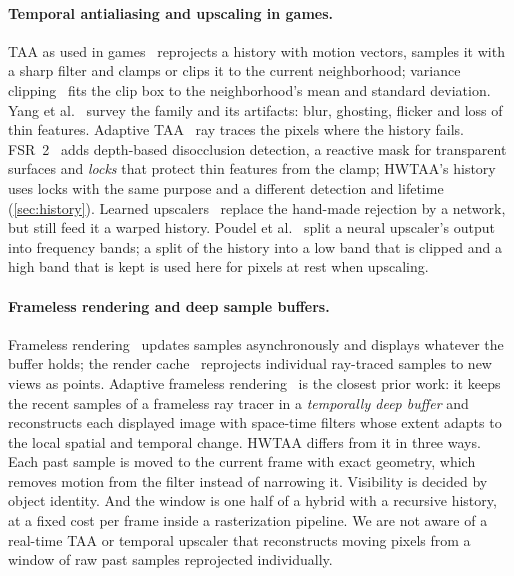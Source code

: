 \documentclass[11pt,a4paper]{article}
\begin{document}
\paragraph{Temporal antialiasing and upscaling in games.} TAA as used in games~\cite{karis2014taa,jimenez2016filmic} reprojects a history with motion vectors, samples it with a sharp filter and clamps or clips it to the current neighborhood; variance clipping~\cite{salvi2016taa} fits the clip box to the neighborhood's mean and standard deviation. Yang et al.~\cite{yang2020survey} survey the family and its artifacts: blur, ghosting, flicker and loss of thin features. Adaptive TAA~\cite{marrs2018ataa} ray traces the pixels where the history fails. FSR~2~\cite{amd2023fsr2} adds depth-based disocclusion detection, a reactive mask for transparent surfaces and \emph{locks} that protect thin features from the clamp; HWTAA's history uses locks with the same purpose and a different detection and lifetime (\cref{sec:history}). Learned upscalers~\cite{liu2020dlss,xiao2020neural} replace the hand-made rejection by a network, but still feed it a warped history. Poudel et al.~\cite{poudel2026wavelet} split a neural upscaler's output into frequency bands; a split of the history into a low band that is clipped and a high band that is kept is used here for pixels at rest when upscaling.

\paragraph{Frameless rendering and deep sample buffers.} Frameless rendering~\cite{bishop1994frameless} updates samples asynchronously and displays whatever the buffer holds; the render cache~\cite{walter1999rendercache} reprojects individual ray-traced samples to new views as points. Adaptive frameless rendering~\cite{dayal2005frameless} is the closest prior work: it keeps the recent samples of a frameless ray tracer in a \emph{temporally deep buffer} and reconstructs each displayed image with space-time filters whose extent adapts to the local spatial and temporal change. HWTAA differs from it in three ways. Each past sample is moved to the current frame with exact geometry, which removes motion from the filter instead of narrowing it. Visibility is decided by object identity. And the window is one half of a hybrid with a recursive history, at a fixed cost per frame inside a rasterization pipeline. We are not aware of a real-time TAA or temporal upscaler that reconstructs moving pixels from a window of raw past samples reprojected individually.
\end{document}
